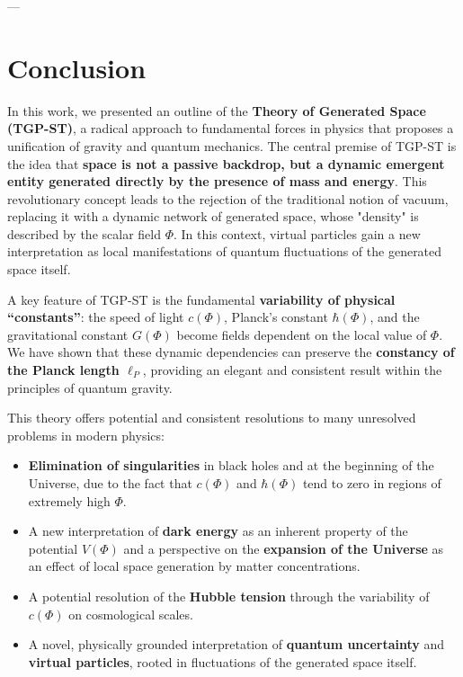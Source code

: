 \documentclass[11pt,a4paper]{article}
\begin{document}
---

\section{Conclusion}
\label{sec:Podsumowanie}

In this work, we presented an outline of the \textbf{Theory of Generated Space (TGP-ST)}, a radical approach to fundamental forces in physics that proposes a unification of gravity and quantum mechanics. The central premise of TGP-ST is the idea that \textbf{space is not a passive backdrop, but a dynamic emergent entity generated directly by the presence of mass and energy}. This revolutionary concept leads to the rejection of the traditional notion of vacuum, replacing it with a dynamic network of generated space, whose "density" is described by the scalar field $\Phi$. In this context, virtual particles gain a new interpretation as local manifestations of quantum fluctuations of the generated space itself.

A key feature of TGP-ST is the fundamental \textbf{variability of physical “constants”}: the speed of light $c(\Phi)$, Planck’s constant $\hbar(\Phi)$, and the gravitational constant $G(\Phi)$ become fields dependent on the local value of $\Phi$. We have shown that these dynamic dependencies can preserve the \textbf{constancy of the Planck length $\ell_P$}, providing an elegant and consistent result within the principles of quantum gravity.

This theory offers potential and consistent resolutions to many unresolved problems in modern physics:
\begin{itemize}
    \item \textbf{Elimination of singularities} in black holes and at the beginning of the Universe, due to the fact that $c(\Phi)$ and $\hbar(\Phi)$ tend to zero in regions of extremely high $\Phi$.
    \item A new interpretation of \textbf{dark energy} as an inherent property of the potential $V(\Phi)$ and a perspective on the \textbf{expansion of the Universe} as an effect of local space generation by matter concentrations.
    \item A potential resolution of the \textbf{Hubble tension} through the variability of $c(\Phi)$ on cosmological scales.
    \item A novel, physically grounded interpretation of \textbf{quantum uncertainty} and \textbf{virtual particles}, rooted in fluctuations of the generated space itself.
\end{itemize}
\end{document}
